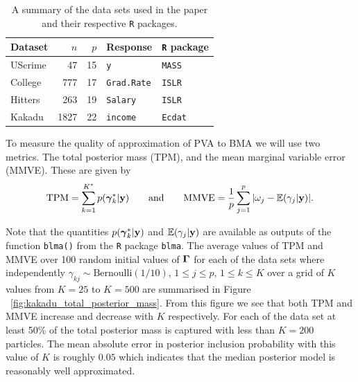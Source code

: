 \begin{table}[ht!]
	\begin{center}
		\begin{tabular}{l|r|r|l|l}
			Dataset	& $n$ & $p$ & Response & {\tt R} package \\ 
			\hline 
			UScrime		& 47 & 15 &  {\tt y} & {\tt MASS} \\  
			College &  777   & 17      &  {\tt Grad.Rate}      & {\tt ISLR} \\ 
			Hitters	& 263 & 19 & {\tt Salary} & {\tt ISLR} \\ 
			Kakadu	& 1827 & 22 & {\tt income} & {\tt Ecdat}   \\  
		\end{tabular} 
	\end{center} \bigskip 
	\caption{A summary of the data sets used in the paper and their respective {\tt R} packages.}
	\label{tab:cva_data sets}
\end{table}

\noindent To measure the quality of approximation of PVA to BMA we will use two
metrics. The total posterior mass (TPM), and the mean marginal variable error
(MMVE). These are given by $$ \displaystyle \mbox{TPM} = \sum_{k=1}^{K^*}
p({\boldsymbol \gamma}_k^*|{\bf y}) \qquad \mbox{and} \qquad \mbox{MMVE} = \frac{1}{p}
\sum_{j=1}^p |\omega_j - {\mathbb E}(\gamma_j|{\bf y}) |. $$

\noindent Note that the quantities $p({\boldsymbol \gamma}_k^*|{\bf y})$ and ${\mathbb E}(\gamma_j|{\bf y})$
are available as outputs of the function {\tt blma()} from the {\tt R} package
{\tt blma}. The average values of TPM and MMVE over 100 random initial values
of ${\boldsymbol \Gamma}$ for each of the data sets where independently $\gamma_{kj} \sim
\mbox{Bernoulli}(1/10)$, $1\le j\le p$, $1\le k\le K$ over a grid of $K$ values
from $K=25$ to $K=500$ are summarised in Figure
~\ref{fig:kakadu_total_posterior_mass}. From this figure we see that both TPM
and MMVE increase and decrease with $K$ respectively. For each of the data set
at least 50\% of the total posterior mass is captured with less than $K=200$
particles. The mean absolute error in posterior inclusion probability with
this value of $K$ is roughly $0.05$ which indicates that the median posterior
model is reasonably well approximated.

	
